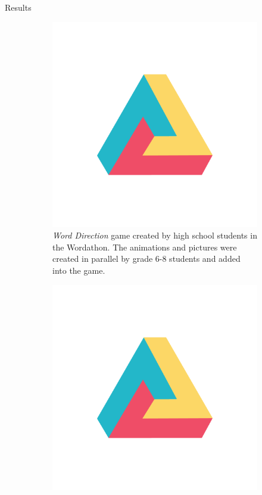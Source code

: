 \documentclass[22pt]{beamer}
\begin{document}
\begin{frame}[fragile]
\begin{textblock}{7.25}
\begin{block}{Results}
\begin{figure}[htbp] %
\begin{subfigure}{0.49\textwidth}
   \centering
   \includegraphics[width=19cm]{dh.png}
   \caption*{\textit{Word Direction} game created by high school students in the Wordathon. The animations and pictures were created in parallel by grade 6-8 students and added into the game.}
   \label{fig:TwoAngles}
\end{subfigure}
\begin{subfigure}{0.45\textwidth}
   \centering
   \includegraphics[width=19cm]{dh.png}

\end{subfigure}
\end{figure}
\end{block}
\end{textblock}
\end{frame}
\end{document}
